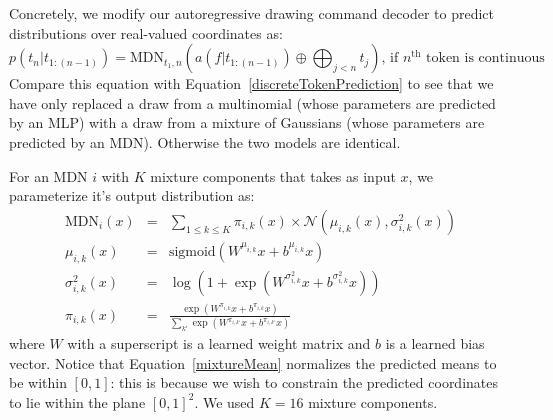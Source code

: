 \documentclass{article}
\begin{document}
Concretely,
we modify our autoregressive drawing command decoder to
predict distributions over real-valued coordinates
as:
\begin{equation}
  p(t_n|t_{1:(n - 1)}) = \text{MDN}_{t_1,n} (a(f|t_{1:(n - 1)}) \oplus \bigoplus_{j < n} t_j)\text{, if }n^{\text{th}}\text{ token is continuous}\label{continuousDensityEquation}
\end{equation}
Compare this equation with Equation~\ref{discreteTokenPrediction} to see that we have only
replaced a draw from a multinomial (whose parameters are predicted by an MLP)
with a draw from a mixture of Gaussians (whose parameters are predicted by an MDN).
Otherwise the two models are identical.

For an MDN $i$ with $K$ mixture components that takes as input $x$, we parameterize it's output distribution as:
\begin{eqnarray}
  \text{MDN}_i(x) &=& \sum_{1\leq k\leq K} \pi_{i,k}(x)\times \mathcal{N}(\mu_{i,k}(x),\sigma^2_{i,k}(x))\\
  \mu_{i,k}(x)& = &\text{sigmoid} (W^{\mu_{i,k}}x + b^{\mu_{i,k}}x)\label{mixtureMean}
  \\\sigma^2_{i,k}(x)& = &\log \left(1 + \exp\left(W^{\sigma^2_{i,k}}x + b^{\sigma^2_{i,k}}x\right) \right)
  \\\pi_{i,k}(x)& = &\frac{\exp\left(W^{\pi_{i,k}}x + b^{\pi_{i,k}}x \right)}{\sum_{k'} \exp\left(W^{\pi_{i,k'}}x + b^{\pi_{i,k'}}x \right)}
  \end{eqnarray}
where $W$ with a superscript is a learned weight matrix and $b$ is a
learned bias vector. Notice that Equation~\ref{mixtureMean} normalizes
the predicted means to be within $[0,1]$: this is because we wish to
constrain the predicted coordinates to lie within the plane
$[0,1]^2$. We used $K = 16$ mixture components.
\end{document}
